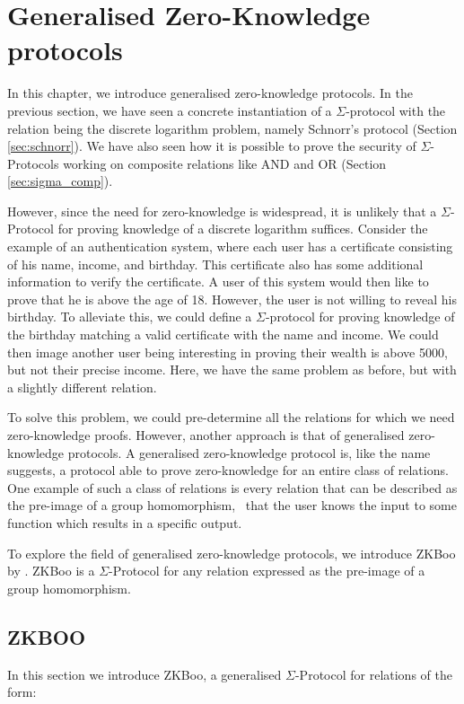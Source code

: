 \chapter{Generalised Zero-Knowledge protocols}
\label{ch:general_zk}
In this chapter, we introduce generalised zero-knowledge protocols.
In the previous section, we have seen a concrete instantiation of a
$\Sigma$-protocol with the relation being the discrete logarithm problem, namely
Schnorr's protocol (Section \ref{sec:schnorr}).
We have also seen how it is possible to prove the security of $\Sigma$-Protocols
working on composite relations like AND and OR (Section \ref{sec:sigma_comp}).

However, since the need for zero-knowledge is widespread, it is unlikely that a
$\Sigma$-Protocol for proving knowledge of a discrete logarithm suffices.
Consider the example of an authentication system, where each user has a
certificate consisting of his name, income, and birthday. This certificate also has some
additional information to verify the certificate.
A user of this system would then like to prove that he is above the age of 18.
However, the user is not willing to reveal his birthday. To alleviate this,
we could define a $\Sigma$-protocol for proving knowledge of the birthday matching
a valid certificate with the name and income.
We could then image another user being interesting in proving their wealth is
above 5000, but not their precise income. Here, we have the same problem as
before, but with a slightly different relation.

To solve this problem, we could pre-determine all the relations for which
we need zero-knowledge proofs. However, another approach is that of generalised
zero-knowledge protocols.
A generalised zero-knowledge protocol is, like the name suggests, a
protocol able to prove zero-knowledge for an entire class of relations.
One example of such a class of relations is every relation that can be
described as the pre-image of a group homomorphism, \ie\ that the user knows the
input to some function which results in a specific output.

To explore the field of generalised zero-knowledge protocols, we introduce ZKBoo
by \cite{zkboo}.
ZKBoo is a $\Sigma$-Protocol for any relation expressed as the
pre-image of a group homomorphism.
\section{ZKBOO}
\label{sec:zkboo}
In this section we introduce ZKBoo, a generalised $\Sigma$-Protocol for
relations of the form:

